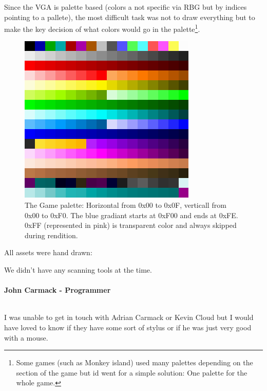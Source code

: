 \documentclass[book.tex]{subfiles}
\begin{document}
Since the VGA is palette based (colors a not specific via RBG but by indices pointing to a pallete), the most difficult task was not to draw everything but to make the key decision of what colors would go in the palette\footnote{Some games (such as Monkey island) used many palettes depending on the section of the game but id went for a simple solution: One palette for the whole game.}.\\
\begin{figure}[H]
  \centering
 \includegraphics[width=\textwidth]{imgs/palette.png}
 \caption{The Game palette: Horizontal from 0x00 to 0x0F, verticall from 0x00 to 0xF0. The blue gradiant starts at 0xF00 and ends at 0xFE. 0xFF (represented in pink) is transparent color and always skipped during rendition.}
\end{figure}

All assets were hand drawn:\\
\begin{fancyquotes}
We didn't have any scanning tools at the time.\\
\\
\textbf{John Carmack - Programmer}
\end{fancyquotes}
\\
I was unable to get in touch with Adrian Carmack or Kevin Cloud but I would have loved to know if they have some sort of stylus or if he was just very good with a mouse.\\
\end{document}
